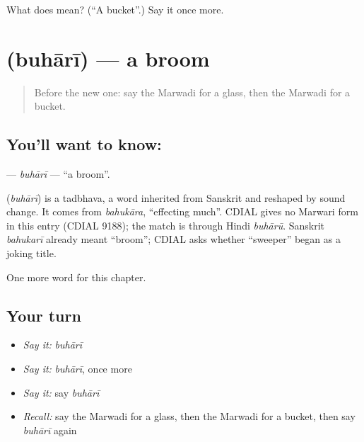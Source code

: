 \begin{tcolorbox}[breakable,colback=teal!4,colframe=teal!35!black,title={Before you move on}]
What does  mean? (\textquotedblleft{}A bucket\textquotedblright{}.) Say it once more.
\end{tcolorbox}
\section[\texorpdfstring{\mw{बुहारी} (buhārī)}{बुहारी (buhārī)}]{ (buhārī) — a broom}

\label{lesson:MW-C119-buhari}



\begin{quote}
Before the new one: say the Marwadi for a glass, then the Marwadi for a bucket.
\end{quote}

\subsection*{You'll want to know: }
\textbf{} — \emph{buhārī} — \textquotedblleft{}a broom\textquotedblright{}.

\begin{cousinweb}
\textbf{} (\emph{buhārī}) is a tadbhava, a word inherited from Sanskrit and reshaped by sound change. It comes from \emph{bahukāra}, \textquotedblleft{}effecting much\textquotedblright{}. CDIAL gives no Marwari form in this entry (CDIAL 9188); the match is through Hindi \emph{buhārū}. Sanskrit \emph{bahukarī} already meant \textquotedblleft{}broom\textquotedblright{}; CDIAL asks whether \textquotedblleft{}sweeper\textquotedblright{} began as a joking title.
\end{cousinweb}

\begin{grammarlens}[title={What you've built}]
One more word for this chapter.
\end{grammarlens}

\subsection*{Your turn}
\begin{itemize}
\raggedright
  \item \emph{Say it:} \emph{buhārī}
  \item \emph{Say it:} \emph{buhārī}, once more
  \item \emph{Say it:} say \emph{buhārī}
  \item \emph{Recall:} say the Marwadi for a glass, then the Marwadi for a bucket, then say \emph{buhārī} again
\end{itemize}

